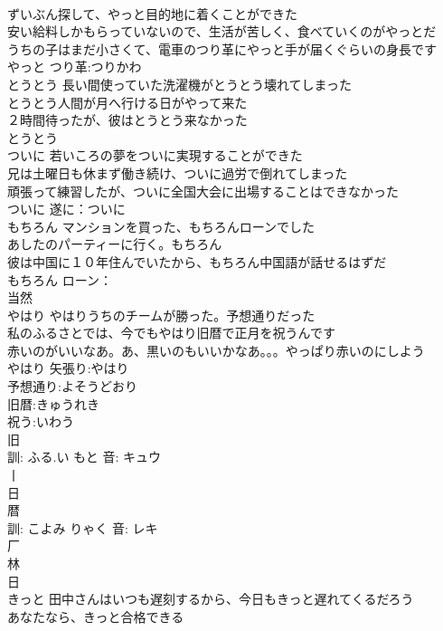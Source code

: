 \documentclass[8pt]{extreport}
\begin{document}
\begin{CJK}{UTF8}{min}
\\	ずいぶん探して、やっと目的地に着くことができた 
\\	安い給料しかもらっていないので、生活が苦しく、食べていくのがやっとだ 
\\	うちの子はまだ小さくて、電車のつり革にやっと手が届くぐらいの身長です 
\\	やっと			つり革:つりかわ
\\	とうとう	長い間使っていた洗濯機がとうとう壊れてしまった 
\\	とうとう人間が月へ行ける日がやって来た 
\\	２時間待ったが、彼はとうとう来なかった 
\\	とうとう						
\\	ついに	若いころの夢をついに実現することができた 
\\	兄は土曜日も休まず働き続け、ついに過労で倒れてしまった 
\\	頑張って練習したが、ついに全国大会に出場することはできなかった 
\\	ついに			遂に：ついに
\\	もちろん	マンションを買った、もちろんローンでした 
\\	あしたのパーティーに行く。もちろん 
\\	彼は中国に１０年住んでいたから、もちろん中国語が話せるはずだ 
\\	もちろん			ローン：
\\	当然 
\\	やはり	やはりうちのチームが勝った。予想通りだった 
\\	私のふるさとでは、今でもやはり旧暦で正月を祝うんです 
\\	赤いのがいいなあ。あ、黒いのもいいかなあ。。。やっぱり赤いのにしよう 
\\	やはり			矢張り:やはり
\\	予想通り:よそうどおり
\\	旧暦:きゅうれき
\\	祝う:いわう
\\	旧 
\\	訓: ふる.い もと 音: キュウ 
\\	丨 
\\	日 
\\	暦 
\\	訓: こよみ りゃく 音: レキ 
\\	厂 
\\	林 
\\	日 
\\	きっと	田中さんはいつも遅刻するから、今日もきっと遅れてくるだろう 
\\	あなたなら、きっと合格できる 

\end{CJK}
\end{document}
